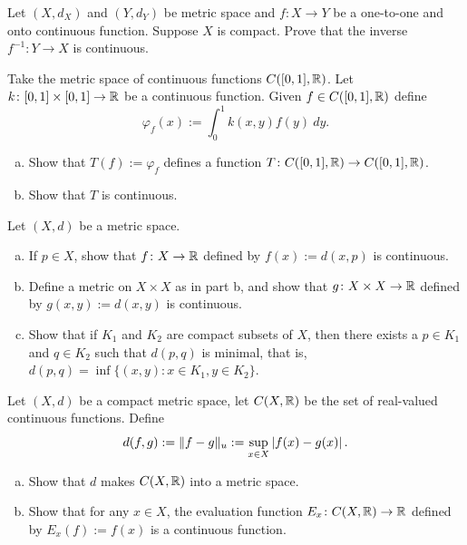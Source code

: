 \begin{exercise}
Let $(X,d_X)$ and $(Y,d_Y)$ be metric space and
$f \colon X \to Y$ be a one-to-one and onto continuous function.  Suppose
$X$ is compact.  Prove that the inverse $f^{-1} \colon Y \to X$
is continuous.
\end{exercise}

\begin{exercise}
Take the metric space of continuous functions $C([0,1],{\mathbb{R}})$.  Let
$k \colon [0,1] \times [0,1] \to {\mathbb{R}}$ be a continuous function.
Given $f \in C([0,1],{\mathbb{R}})$ define
\begin{equation*}
\varphi_f(x) := \int_0^1 k(x,y) f(y) ~dy .
\end{equation*}
\begin{enumerate}[a)]
\item
Show that $T(f) := \varphi_f$ defines a function $T \colon C([0,1],{\mathbb{R}}) \to
C([0,1],{\mathbb{R}})$.
\item
Show that $T$ is continuous.
\end{enumerate}
\end{exercise}

\begin{samepage}
\begin{exercise}
Let $(X,d)$ be a metric space.
\begin{enumerate}[a)]
\item
If $p \in X$,
show that $f \colon X \to {\mathbb{R}}$ defined
by $f(x) := d(x,p)$ is continuous.
\item
Define a metric on $X \times X$ as in  part
b, and show that $g \colon X \times X \to {\mathbb{R}}$ defined by
$g(x,y) := d(x,y)$ is continuous.
\item
Show that if $K_1$ and $K_2$ are compact subsets of $X$, then
there exists a $p \in K_1$ and $q \in K_2$ such that $d(p,q)$ is minimal,
that is, $d(p,q) = \inf \{ (x,y) \colon x \in K_1, y \in K_2 \}$.
\end{enumerate}
\end{exercise}
\end{samepage}

\begin{exercise}
Let $(X,d)$ be a compact metric space, let $C(X,{\mathbb{R}})$ be the set
of real-valued continuous functions.  Define
\begin{equation*}
d(f,g) := \lVert {f-g} \rVert_u := \sup_{x \in X} \left\lvert {f(x)-g(x)} \right\rvert .
\end{equation*}
\begin{enumerate}[a)]
\item
Show that $d$ makes $C(X,{\mathbb{R}})$ into a metric space.
\item
Show that for any $x \in X$, the evaluation function
$E_x \colon C(X,{\mathbb{R}}) \to {\mathbb{R}}$ defined by $E_x(f) := f(x)$
is a continuous function.
\end{enumerate}
\end{exercise}

